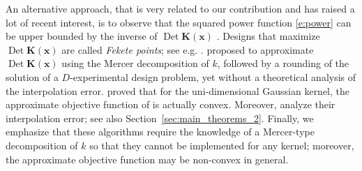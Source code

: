 \documentclass[twoside,11pt]{book}
\numberwithin{theorem}{chapter}
\numberwithin{definition}{chapter}
\numberwithin{proposition}{chapter}
\numberwithin{corollary}{chapter}
\numberwithin{example}{chapter}
\numberwithin{lemma}{chapter}
\DeclareMathOperator{\Det}{Det}
\DeclareMathOperator{\X}{\mathcal{X}}
\newcommand{\pc}[1]{\textcolor{blue}{#1}}
\newcommand{\rb}[1]{\textcolor{magenta}{#1}}
\begin{document}



An alternative approach, that is very related to our contribution and has raised a lot of recent interest, is to observe that the squared power function \eqref{e:power} can be upper bounded by the inverse of $\Det \bm{K}(\bm{x})$ \citep{Sch05,Tan19}.
 Designs that maximize $\Det \bm{K}(\bm{x})$ are called \emph{Fekete points}; see e.g. \citep{BoMa02,BoDe11}.
\cite{Tan19} proposed to approximate $\Det \bm{K}(\bm{x})$ using the Mercer decomposition of $k$, followed by a rounding of the solution of a $D$-experimental design problem, yet without a theoretical analysis of the interpolation error.
\cite{KaSaTa19} proved that for the uni-dimensional Gaussian kernel, the approximate objective function of \citep{Tan19} is actually convex. Moreover, \cite{KaSaTa19} analyze their interpolation error; see also Section~\ref{sec:main_theorems_2}.
Finally, we emphasize that these algorithms require the knowledge of a Mercer-type decomposition of $k$ so that they cannot be implemented for any kernel; moreover, the approximate objective function may be non-convex in general.
\end{document}
